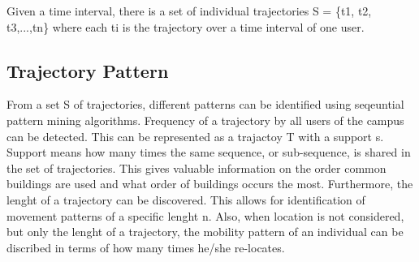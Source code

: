 Given a time interval, there is a set of individual trajectories S = \{t1, t2, t3,...,tn\} where each ti is the trajectory over a time interval of one user. 

\subsection{Trajectory Pattern}
From a set S of trajectories, different patterns can be identified using seqeuntial pattern mining algorithms. Frequency of a trajectory by all users of the campus can be detected. This can be represented as a trajactoy T with a support s. Support means how many times the same sequence, or sub-sequence, is shared in the set of trajectories. This gives valuable information on the order common buildings are used and what order of buildings occurs the most. Furthermore, the lenght of a trajectory can be discovered. This allows for identification of movement patterns of a specific lenght n. Also, when location is not considered, but only the lenght of a trajectory, the mobility pattern of an individual can be discribed in terms of how many times he/she re-locates. 
